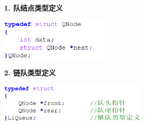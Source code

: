 \textbf{{1. 队结点类型定义}}

\includegraphics[width=2.08333in,height=0.79167in]{png-jpeg-pics/3B363F7937B1F95EB70FC8F952115276.png}

\textbf{2. 链队类型定义}

\includegraphics[width=2.81250in,height=0.73958in]{png-jpeg-pics/D2F3463CE7D9AFA2634EFAD952154C9F.png}\\
